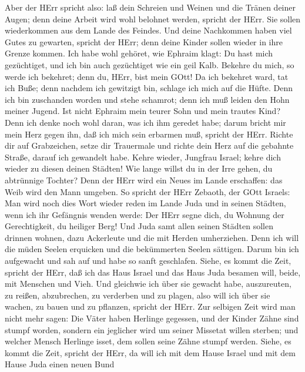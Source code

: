  Aber der HErr spricht also: laß dein Schreien und Weinen
und die Tränen deiner Augen; denn deine Arbeit wird wohl belohnet
werden, spricht der HErr. Sie sollen wiederkommen aus dem Lande des
Feindes.  Und deine Nachkommen haben viel Gutes zu
gewarten, spricht der HErr; denn deine Kinder sollen wieder in ihre
Grenze kommen.  Ich habe wohl gehöret, wie Ephraim klagt:
Du hast mich gezüchtiget, und ich bin auch gezüchtiget wie ein geil
Kalb. Bekehre du mich, so werde ich bekehret; denn du, HErr, bist mein
GOtt!  Da ich bekehret ward, tat ich Buße; denn nachdem ich
gewitzigt bin, schlage ich mich auf die Hüfte. Denn ich bin zuschanden
worden und stehe schamrot; denn ich muß leiden den Hohn meiner Jugend.
 Ist nicht Ephraim mein teurer Sohn und mein trautes Kind?
Denn ich denke noch wohl daran, was ich ihm geredet habe; darum bricht
mir mein Herz gegen ihn, daß ich mich sein erbarmen muß, spricht der
HErr.  Richte dir auf Grabzeichen, setze dir Trauermale und
richte dein Herz auf die gebahnte Straße, darauf ich gewandelt habe.
Kehre wieder, Jungfrau Israel; kehre dich wieder zu diesen deinen
Städten!  Wie lange willst du in der Irre gehen, du
abtrünnige Tochter? Denn der HErr wird ein Neues im Lande erschaffen:
das Weib wird den Mann umgeben.  So spricht der HErr
Zebaoth, der GOtt Israels: Man wird noch dies Wort wieder reden im Lande
Juda und in seinen Städten, wenn ich ihr Gefängnis wenden werde: Der
HErr segne dich, du Wohnung der Gerechtigkeit, du heiliger Berg!
 Und Juda samt allen seinen Städten sollen drinnen wohnen,
dazu Ackerleute und die mit Herden umherziehen.  Denn ich
will die müden Seelen erquicken und die bekümmerten Seelen sättigen.
 Darum bin ich aufgewacht und sah auf und habe so sanft
geschlafen.  Siehe, es kommt die Zeit, spricht der HErr,
daß ich das Haus Israel und das Haus Juda besamen will, beide, mit
Menschen und Vieh.  Und gleichwie ich über sie gewacht
habe, auszureuten, zu reißen, abzubrechen, zu verderben und zu plagen,
also will ich über sie wachen, zu bauen und zu pflanzen, spricht der
HErr.  Zur selbigen Zeit wird man nicht mehr sagen: Die
Väter haben Herlinge gegessen, und der Kinder Zähne sind stumpf worden,
 sondern ein jeglicher wird um seiner Missetat willen
sterben; und welcher Mensch Herlinge isset, dem sollen seine Zähne
stumpf werden.  Siehe, es kommt die Zeit, spricht der HErr,
da will ich mit dem Hause Israel und mit dem Hause Juda einen neuen Bund

